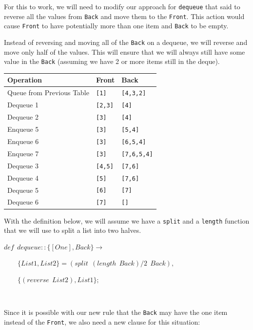\documentclass[
]{book}
\begin{document}
For this to work, we will need to modify our approach for \texttt{dequeue} that said to reverse all the values from \texttt{Back} and move them to the \texttt{Front}. This action would cause \texttt{Front} to have potentially more than one item and \texttt{Back} to be empty.

Instead of reversing and moving all of the \texttt{Back} on a dequeue, we will reverse and move only half of the values. This will ensure that we will always still have some value in the \texttt{Back} (assuming we have 2 or more items still in the deque).

\begin{longtable}[]{@{}lll@{}}
\toprule
Operation & Front & Back \\
\midrule
\endhead
Queue from Previous Table & \texttt{{[}1{]}} & \texttt{{[}4,3,2{]}} \\
Dequeue 1 & \texttt{{[}2,3{]}} & \texttt{{[}4{]}} \\
Dequeue 2 & \texttt{{[}3{]}} & \texttt{{[}4{]}} \\
Enqueue 5 & \texttt{{[}3{]}} & \texttt{{[}5,4{]}} \\
Enqueue 6 & \texttt{{[}3{]}} & \texttt{{[}6,5,4{]}} \\
Enqueue 7 & \texttt{{[}3{]}} & \texttt{{[}7,6,5,4{]}} \\
Dequeue 3 & \texttt{{[}4,5{]}} & \texttt{{[}7,6{]}} \\
Dequeue 4 & \texttt{{[}5{]}} & \texttt{{[}7,6{]}} \\
Dequeue 5 & \texttt{{[}6{]}} & \texttt{{[}7{]}} \\
Dequeue 6 & \texttt{{[}7{]}} & \texttt{{[}{]}} \\
\bottomrule
\end{longtable}

With the definition below, we will assume we have a \texttt{split} and a \texttt{length} function that we will use to split a list into two halves.

\begin{formulabox}
\(de\mathit{f} ~ ~ dequeue :: \lbrace [One], Back \rbrace \rightarrow\)

\(\quad \quad \lbrace List1, List2 \rbrace = (split ~ ~ (length ~ ~ Back) / 2 ~ ~ Back),\)

\(\quad \quad \lbrace (reverse ~ ~ List2), List1 \rbrace;\)

\end{formulabox}

\(\nonumber\)

Since it is possible with our new rule that the \texttt{Back} may have the one item instead of the \texttt{Front}, we also need a new clause for this situation:
\end{document}
